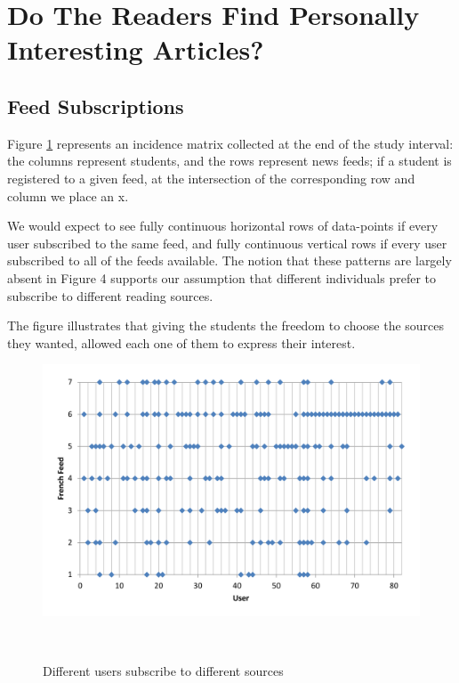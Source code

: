 
\newpage
\section{Do The Readers Find Personally Interesting Articles?}

\subsection {Feed Subscriptions}
Figure \ref{fig:registrations} represents an incidence matrix collected at the end of the study interval: the columns represent students, and the rows represent news feeds; if a student is registered to a given feed, at the intersection of the corresponding row and column we place an x. 

We would expect to see fully continuous horizontal rows of data-points if every user subscribed to the same feed, and fully continuous vertical rows if every user subscribed to all of the feeds available. The notion that these patterns are largely absent in Figure 4 supports our assumption that different individuals prefer to subscribe to different reading sources.

The figure illustrates that giving the students the freedom to choose the sources they wanted, allowed each one of them to express their interest. 

\begin{figure}[h!]
\centering
  \includegraphics[width=\columnwidth]{figures/users_feeds}
  \caption{Different users subscribe to different sources}~\label{fig:registrations}
\end{figure}


